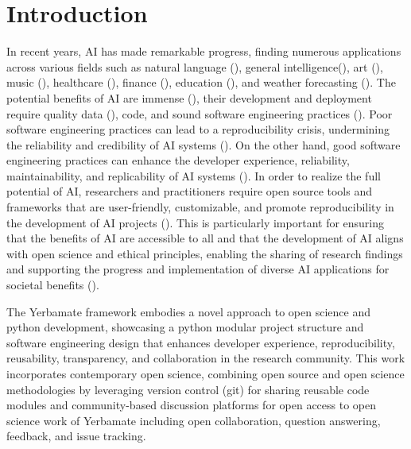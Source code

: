 
\section{Introduction}


 In recent years, AI has made remarkable progress, finding numerous applications across various fields such as natural language (\cite{gpt}), general intelligence(\cite{gato}), art (\cite{diffusion}), music (\cite{musiclm}), healthcare (\cite{aihealthcare}), finance (\cite{bao2022fraudartificial}), education (\cite{aieducation}), and weather forecasting (\cite{weather}). The potential benefits of AI are immense (\cite{beneficialai,potencialaibenefit}), their development and deployment require quality data (\cite{lecun2015deep}), code, and sound software engineering practices (\cite{se4dl,amershi2019software}). Poor software engineering practices can lead to a reproducibility crisis, undermining the reliability and credibility of AI systems (\cite{leakage-recrisis}). On the other hand, good software engineering practices can enhance the developer experience, reliability, maintainability, and replicability of AI systems (\cite{se4dl,amershi2019software, wan2019does}). In order to realize the full potential of AI, researchers and practitioners require open source tools and frameworks that are user-friendly, customizable, and promote reproducibility in the development of AI projects (\cite{lu2022softwareAIReponse,li2018can,wolf2020designing,olson2018system,ong2021guide,gundersen2018reproducible}). This is particularly important for ensuring that the benefits of AI are accessible to all and that the development of AI aligns with open science and ethical principles, enabling the sharing of research findings and supporting the progress and implementation of diverse AI applications for societal benefits (\cite{coro2020open,braun2018open, mittelstadt2016ethics,floridi2018ai4people,ong2021guide}).

The Yerbamate framework embodies a novel approach to open science and python development, showcasing a python modular project structure and software engineering design that enhances developer experience, reproducibility, reusability, transparency, and collaboration in the research community.
This work incorporates contemporary open science, combining open source and open science methodologies by leveraging version control (git) for sharing reusable code modules and community-based discussion platforms for open access to open science work of Yerbamate including open collaboration, question answering, feedback, and issue tracking. 

